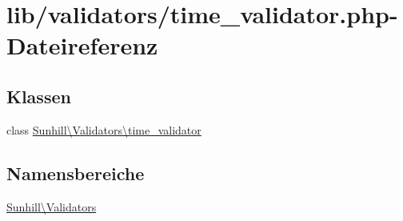 \hypertarget{time__validator_8php}{}\section{lib/validators/time\+\_\+validator.php-\/\+Dateireferenz}
\label{time__validator_8php}
\subsection*{Klassen}
\begin{DoxyCompactItemize}
\item 
class \hyperlink{classSunhill_1_1Validators_1_1time__validator}{Sunhill\textbackslash{}\+Validators\textbackslash{}time\+\_\+validator}
\end{DoxyCompactItemize}
\subsection*{Namensbereiche}
\begin{DoxyCompactItemize}
\item 
 \hyperlink{namespaceSunhill_1_1Validators}{Sunhill\textbackslash{}\+Validators}
\end{DoxyCompactItemize}
